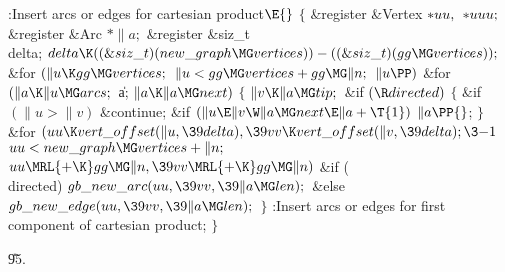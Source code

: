 \B{}:Insert arcs or edges for cartesian product\X${}\E{}$\6
${}\{{}$\5
\1\&{register} \&{Vertex} ${}{*}\\{uu},{}$ ${}{*}\\{uuu};{}$\6
\&{register} \&{Arc} ${}{*}\|a;{}$\6
\&{register} \&{siz\_t} \\{delta};\7
${}\\{delta}\K((\&{siz\_t})(\\{new\_graph}\MG\\{vertices}))-((\&{siz\_t})(%
\\{gg}\MG\\{vertices}));{}$\6
\&{for} ${}(\|u\K\\{gg}\MG\\{vertices};{}$ ${}\|u<\\{gg}\MG\\{vertices}+\\{gg}%
\MG\|n;{}$ ${}\|u\PP){}$\1\6
\&{for} ${}(\|a\K\|u\MG\\{arcs};{}$ \|a; ${}\|a\K\|a\MG\\{next}){}$\5
${}\{{}$\1\6
${}\|v\K\|a\MG\\{tip};{}$\6
\&{if} ${}(\R\\{directed}){}$\5
${}\{{}$\1\6
\&{if} ${}(\|u>\|v){}$\1\5
\&{continue};\2\6
\&{if} ${}(\|u\E\|v\W\|a\MG\\{next}\E\|a+\T{1}){}$\1\5
${}\|a\PP{}$;\2\6
\4${}\}{}$\2\6
\&{for} ${}(\\{uu}\K\\{vert\_offset}(\|u,\39\\{delta}),\39\\{vv}\K\\{vert%
\_offset}(\|v,\39\\{delta});\3{-1}{}$ ${}\\{uu}<\\{new\_graph}\MG\\{vertices}+%
\|n;{}$ ${}\\{uu}\MRL{+{\K}}\\{gg}\MG\|n,\39\\{vv}\MRL{+{\K}}\\{gg}\MG\|n){}$\1%
\6
\&{if} (\\{directed})\1\5
${}\\{gb\_new\_arc}(\\{uu},\39\\{vv},\39\|a\MG\\{len});{}$\2\6
\&{else}\1\5
${}\\{gb\_new\_edge}(\\{uu},\39\\{vv},\39\|a\MG\\{len});{}$\2\2\6
\4${}\}{}$\2\2\6
:Insert arcs or edges for first component of cartesian product\X;\6
\4${}\}{}$\2\par
\U95.\fi

